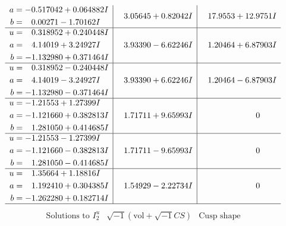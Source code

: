 \documentclass[1p]{elsarticle_modified}
\theoremstyle{definition}
\newcommand{\I}{\sqrt{-1}}
\begin{document}
$$\begin{array}{c|c|c}
\begin{aligned}
a &= -0.517042 + 0.064882 I \\
b &= \phantom{-}0.00271 - 1.70162 I\end{aligned}
 & \phantom{-}3.05645 + 0.82042 I & \phantom{-}17.9553 + 12.9751 I \\ \hline\begin{aligned}
u &= \phantom{-}0.318952 + 0.240448 I \\
a &= \phantom{-}4.14019 + 3.24927 I \\
b &= -1.132980 + 0.371464 I\end{aligned}
 & \phantom{-}3.93390 - 6.62246 I & \phantom{-}1.20464 + 6.87903 I \\ \hline\begin{aligned}
u &= \phantom{-}0.318952 - 0.240448 I \\
a &= \phantom{-}4.14019 - 3.24927 I \\
b &= -1.132980 - 0.371464 I\end{aligned}
 & \phantom{-}3.93390 + 6.62246 I & \phantom{-}1.20464 - 6.87903 I \\ \hline\begin{aligned}
u &= -1.21553 + 1.27399 I \\
a &= -1.121660 + 0.382813 I \\
b &= \phantom{-}1.281050 + 0.414685 I\end{aligned}
 & \phantom{-}1.71711 + 9.65993 I & \phantom{-0.000000 } 0 \\ \hline\begin{aligned}
u &= -1.21553 - 1.27399 I \\
a &= -1.121660 - 0.382813 I \\
b &= \phantom{-}1.281050 - 0.414685 I\end{aligned}
 & \phantom{-}1.71711 - 9.65993 I & \phantom{-0.000000 } 0 \\ \hline\begin{aligned}
u &= \phantom{-}1.35664 + 1.18816 I \\
a &= \phantom{-}1.192410 + 0.304385 I \\
b &= -1.262280 + 0.182714 I\end{aligned}
 & \phantom{-}1.54929 - 2.22734 I & \phantom{-0.000000 } 0\\
 \hline 
 \end{array}$$\newpage$$\begin{array}{c|c|c}  
\text{Solutions to }I^u_{2}& \I (\text{vol} + \sqrt{-1}CS) & \text{Cusp shape}\\
 \hline 
\begin{aligned}

\end{aligned}
\end{array}$$
\end{document}
